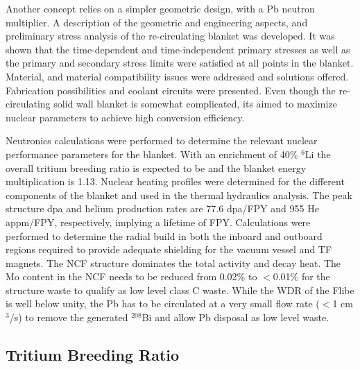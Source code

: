 Another concept relies on a simpler geometric design, with a \gls{Pb} neutron
multiplier.  A description of the geometric and engineering aspects, and
preliminary stress analysis of the re-circulating blanket was developed. It
was shown that the time-dependent and time-independent primary stresses as
well as the primary and secondary stress limits were satisfied at all points
in the blanket. Material, and material compatibility issues were addressed and
solutions offered. Fabrication possibilities and coolant circuits were
presented. Even though the re-circulating solid wall blanket is somewhat
complicated, its aimed to maximize nuclear parameters to achieve high
conversion efficiency.

Neutronics calculations were performed to determine the relevant nuclear
performance parameters for the blanket. With an enrichment of 40\% $^6$Li the
overall tritium breeding ratio is expected to be  and the
blanket energy multiplication is 1.13. Nuclear heating profiles were
determined for the different components of the blanket and used in the thermal
hydraulics analysis. The peak structure dpa and helium production rates are
77.6 dpa/FPY and 955 He appm/FPY, respectively, implying a lifetime of
 FPY. Calculations were performed to determine the radial build
in both the inboard and outboard regions required to provide adequate
shielding for the vacuum vessel and \gls{TF} magnets. The \gls{NCF} structure
dominates the total activity and decay heat. The Mo content in the \gls{NCF}
needs to be reduced from 0.02\% to $<$0.01\% for the structure waste to
qualify as low level class C waste.  While the \gls{WDR} of the Flibe is well
below unity, the \gls{Pb} has to be circulated at a very small flow rate ($<$1
cm$^3$/s) to remove the generated $^{208}$Bi and allow \gls{Pb} disposal as
low level waste.


\subsection{Tritium Breeding Ratio}

